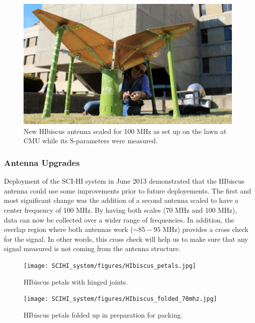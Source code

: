 \begin{figure}[htb]
\begin{center}
\includegraphics[width=0.95\linewidth]{SCIHI_system/figures/HIbiscus_100mhz.jpg}
\caption{New HIbiscus antenna scaled for 100 MHz as set up on the lawn at CMU while its S-parameters were measured. }
\label{Fig:hibiscus_100}
\end{center}
\end{figure}

\subsubsection{Antenna Upgrades}
Deployment of the SCI-HI system in June 2013 demonstrated that the HIbiscus antenna could use some improvements prior to future deployements. The first and most significant change was the addition of a second antenna scaled to have a center frequency of 100 MHz. By having both scales (70 MHz and 100 MHz), data can now be collected over a wider range of frequencies. In addition, the overlap region where both antennas work ($\sim 85-95$ MHz) provides a cross check for the signal. In other words, this cross check will help us to make sure that any signal measured is not coming from the antenna structure. 

\begin{figure}[htb]
\centering
\begin{minipage}[b]{0.33\textwidth}
\centering
\texttt{[image: SCIHI\_system/figures/HIbiscus\_petals.jpg]}
\caption{HIbiscus petals with hinged joints.}
\label{Fig:hibiscus_petal}
\end{minipage}%
\begin{minipage}[b]{0.02\textwidth}
\hspace{1cm}
\end{minipage}%
\begin{minipage}[b]{0.61\textwidth}
\centering
\texttt{[image: SCIHI\_system/figures/HIbiscus\_folded\_70mhz.jpg]}
\caption{HIbiscus petals folded up in preparation for packing.}
\label{Fig:hibiscus_fold}
\end{minipage}
\end{figure}

